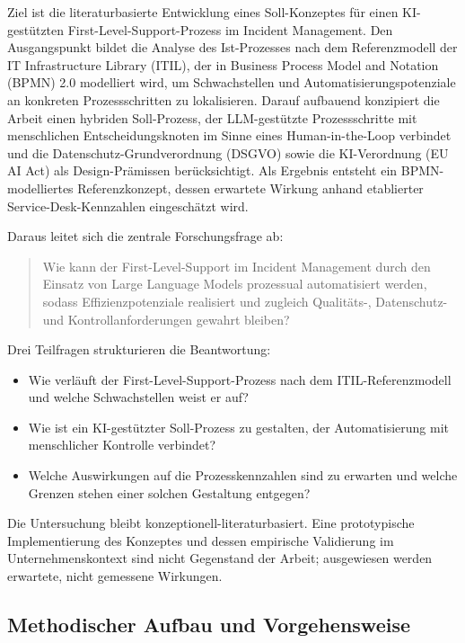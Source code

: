 Ziel ist die literaturbasierte Entwicklung eines Soll-Konzeptes f\"ur einen KI-gest\"utzten First-Level-Support-Prozess im Incident Management. Den Ausgangspunkt bildet die Analyse des Ist-Prozesses nach dem Referenzmodell der IT Infrastructure Library (ITIL), der in Business Process Model and Notation (BPMN) 2.0 modelliert wird, um Schwachstellen und Automatisierungspotenziale an konkreten Prozessschritten zu lokalisieren. Darauf aufbauend konzipiert die Arbeit einen hybriden Soll-Prozess, der LLM-gest\"utzte Prozessschritte mit menschlichen Entscheidungsknoten im Sinne eines Human-in-the-Loop verbindet und die Datenschutz-Grundverordnung (DSGVO) sowie die KI-Verordnung (EU AI Act) als Design-Pr\"amissen ber\"ucksichtigt. Als Ergebnis entsteht ein BPMN-modelliertes Referenzkonzept, dessen erwartete Wirkung anhand etablierter Service-Desk-Kennzahlen eingesch\"atzt wird.

Daraus leitet sich die zentrale Forschungsfrage ab:

\begin{quote}
\glqq Wie kann der First-Level-Support im Incident Management durch den Einsatz von Large Language Models prozessual automatisiert werden, sodass Effizienzpotenziale realisiert und zugleich Qualit\"ats-, Datenschutz- und Kontrollanforderungen gewahrt bleiben?\grqq{}
\end{quote}

Drei Teilfragen strukturieren die Beantwortung:

\begin{itemize}[leftmargin=3.2em,nosep]
	\item[TF1:] Wie verl\"auft der First-Level-Support-Prozess nach dem ITIL-Referenzmodell und welche Schwachstellen weist er auf?
	\item[TF2:] Wie ist ein KI-gest\"utzter Soll-Prozess zu gestalten, der Automatisierung mit menschlicher Kontrolle verbindet?
	\item[TF3:] Welche Auswirkungen auf die Prozesskennzahlen sind zu erwarten und welche Grenzen stehen einer solchen Gestaltung entgegen?
\end{itemize}

Die Untersuchung bleibt konzeptionell-literaturbasiert. Eine prototypische Implementierung des Konzeptes und dessen empirische Validierung im Unternehmenskontext sind nicht Gegenstand der Arbeit; ausgewiesen werden erwartete, nicht gemessene Wirkungen.

\subsection{Methodischer Aufbau und Vorgehensweise}
\label{methodik}

